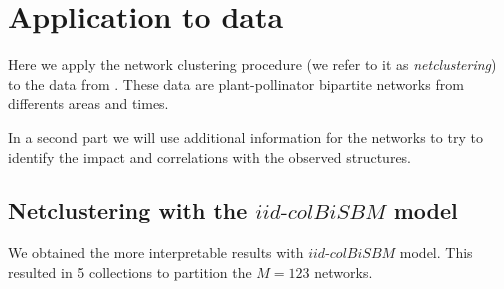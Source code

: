 \hypertarget{application-to-data}{%
\section{\texorpdfstring{Application to
\cite{doreRelativeEffectsAnthropogenic2021}
data}{Application to  data}}\label{application-to-data}}

\label{sec:application-to-dorerelativeeffectsanthropogenic2021-data}

Here we apply the network clustering procedure (we refer to it as
\emph{netclustering}) to the data from
\cite{doreRelativeEffectsAnthropogenic2021}. These data are
plant-pollinator bipartite networks from differents areas and times.

In a second part we will use additional information for the networks to
try to identify the impact and correlations with the observed
structures.

\hypertarget{netclustering-with-the-iidtext-colbisbm-model}{%
\subsection{\texorpdfstring{Netclustering with the
\(iid\text{-}colBiSBM\)
model}{Netclustering with the iid\textbackslash text\{-\}colBiSBM model}}\label{netclustering-with-the-iidtext-colbisbm-model}}

We obtained the more interpretable results with \(iid\text{-}colBiSBM\)
model. This resulted in 5 collections to partition the \(M = 123\)
networks.

